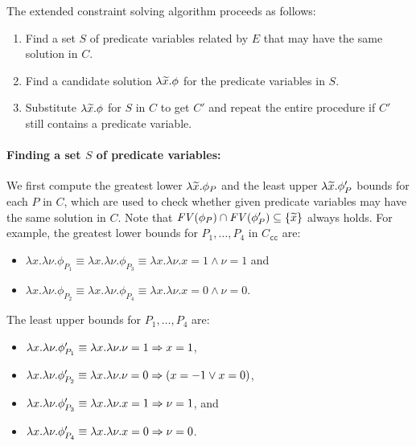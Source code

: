 
The extended constraint solving algorithm proceeds as follows:
\begin{enumerate}
\item Find a set \(S\) of predicate variables related by \(E\) that may
have the same solution in \(C\).
\item Find a candidate solution \(\lambda \widetilde{x}.\phi\) for the
predicate variables in \(S\).
\item Substitute \(\lambda \widetilde{x}.\phi\) for \(S\) in \(C\) to get
\(C'\) and repeat the entire procedure if \(C'\) still contains a
predicate variable.
\end{enumerate}

\paragraph{Finding a set \(S\) of predicate variables:}
We first compute the greatest lower \(\lambda \widetilde{x}.\phi_P\) and the
least upper \(\lambda \widetilde{x}.\phi_P'\) bounds for each \(P\) in \(C\),
which are used to check whether given predicate variables may have the
same solution in \(C\).  Note that \(\mathit{FV}({\phi_P}) \cap \mathit{FV}({\phi_P'})
\subseteq \{{\widetilde{x}}\}\) always holds.
%
For example, the greatest lower bounds for \(P_1,\dots,P_4\) in
\(C_{\texttt{cc}}\) are:
\vspace{-4pt}
\begin{itemize}
\item \(\lambda x.\lambda \nu.\phi_{P_1} \equiv \lambda x.\lambda \nu.\phi_{P_3} \equiv \lambda x.\lambda \nu.x=1 \land \nu=1\) and
\item \(\lambda x.\lambda \nu.\phi_{P_2} \equiv \lambda x.\lambda \nu.\phi_{P_4} \equiv \lambda x.\lambda \nu.x=0 \land \nu=0\).
\end{itemize}
\vspace{-4pt}
The least upper bounds for \(P_1,\dots,P_4\) are:
\vspace{-4pt}
\begin{itemize}
\item \(\lambda x.\lambda \nu.\phi_{P_1}'\equiv \lambda x.\lambda \nu.\nu=1 \Rightarrow x=1\),
\item \(\lambda x.\lambda \nu.\phi_{P_2}'\equiv \lambda x.\lambda \nu.\nu=0 \Rightarrow (x=-1 \lor x=0)\),
\item \(\lambda x.\lambda \nu.\phi_{P_3}'\equiv \lambda x.\lambda \nu.x=1 \Rightarrow \nu=1\), and
\item \(\lambda x.\lambda \nu.\phi_{P_4}'\equiv \lambda x.\lambda \nu.x=0 \Rightarrow \nu=0\).
\end{itemize}
\vspace{-4pt}

